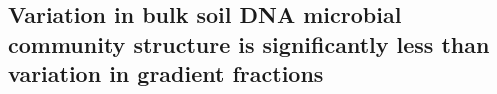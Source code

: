 \subsection{Variation in bulk soil DNA microbial community structure is
significantly less than variation in gradient fractions} 
